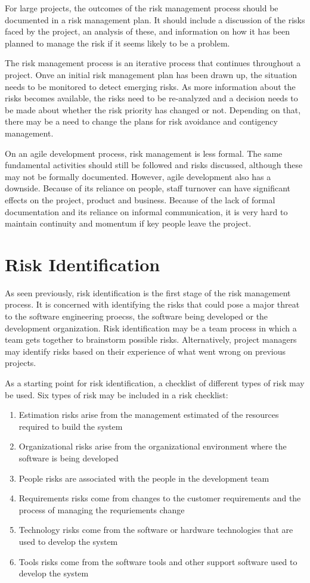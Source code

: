 For large projects, the outcomes of the risk management process should be documented in a risk management plan. It should include a discussion of the risks faced by the project, an analysis of these, and information on how it has been planned to manage the risk if it seems likely to be a problem.

The risk management process is an iterative process that continues throughout a project. Onve an initial risk management plan has been drawn up, the situation needs to be monitored to detect emerging risks. As more information about the risks becomes available, the risks need to be re-analyzed and a decision needs to be made about whether the risk priority has changed or not. Depending on that, there may be a need to change the plans for risk avoidance and contigency management.

On an agile development process, risk management is less formal. The same fundamental activities should still be followed and risks discussed, although these may not be formally documented. However, agile development also has a downside. Because of its reliance on people, staff turnover can have significant effects on the project, product and business. Because of the lack of formal documentation and its reliance on informal communication, it is very hard to maintain continuity and momentum if key people leave the project.

\section{Risk Identification}
As seen previously, risk identification is the first stage of the risk management process. It is concerned with identifying the risks that could pose a major threat to the software engineering proecss, the software being developed or the development organization. Risk identification may be a team process in which a team gets together to brainstorm possible risks. Alternatively, project managers may identify risks based on their experience of what went wrong on previous projects.

As a starting point for risk identification, a checklist of different types of risk may be used. Six types of risk may be included in a risk checklist:
\begin{enumerate}
    \item Estimation risks arise from the management estimated of the resources required to build the system
    \item Organizational risks arise from the organizational environment where the software is being developed
    \item People risks are associated with the people in the development team
    \item Requirements risks come from changes to the customer requirements and the process of managing the requriements change
    \item Technology risks come from the software or hardware technologies that are used to develop the system
    \item Tools risks come from the software tools and other support software used to develop the system
\end{enumerate}

